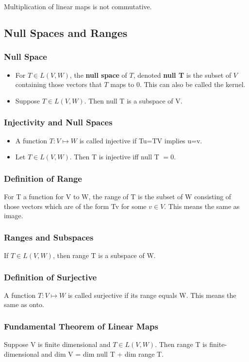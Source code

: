 \documentclass{article}
\begin{document}
Multiplication of linear maps is not commutative.

\subsection{Null Spaces and Ranges}


\subsubsection{Null Space}
\begin{itemize}

\item For $T \in L(V,W)$, the \textbf{null space} of $T$, denoted \textbf{null T} is the subset of $V$ containing those vectors that $T$ maps to 0. This can also be called the kernel.

\item Suppose $T \in L(V,W)$. Then null T is a subspace of V.

\end{itemize}

\subsubsection{Injectivity and Null Spaces}

\begin{itemize}
\item A function $T: V \mapsto W$ is called injective if Tu=TV implies u=v.
\item Let $T \in L(V,W)$. Then T is injective iff null T $={0}$.

\end{itemize}

\subsubsection{Definition of Range}

For T a function for V to W, the range of T is the subset of W consisting of those vectors which are of the form Tv for some $v \in V$.  This means the same as image.

\subsubsection{Ranges and Subspaces}
If $T \in L(V,W)$, then range T is a subspace of W. 

\subsubsection{Definition of Surjective}

A function $T: V \mapsto W$ is called surjective if its range equals W. This means the same as onto.

\subsubsection{Fundamental Theorem of Linear Maps}

Suppose V is finite dimensional and $T \in L(V,W)$. Then range T is finite-dimensional and dim V = dim null T + dim range T. 
\end{document}
